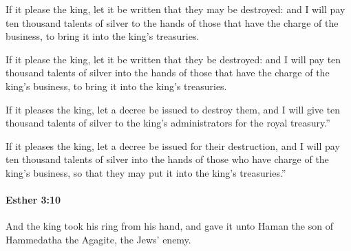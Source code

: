 			If it please the king, let it be written that they may be destroyed: and I will pay ten thousand talents of silver to the hands of those that have the charge of the business, to bring it into the king’s treasuries.

			\begin{versebox}
					\item[BHS] 
					\item[LXX] 
					\item[ASV] If it please the king, let it be written that they be destroyed: and I will pay ten thousand talents of silver into the hands of those that have the charge of the king's business, to bring it into the king's treasuries.
					\item[NIV] If it pleases the king, let a decree be issued to destroy them, and I will give ten thousand talents of silver to the king’s administrators for the royal treasury.”
					\item[NRSV] If it pleases the king, let a decree be issued for their destruction, and I will pay ten thousand talents of silver into the hands of those who have charge of the king’s business, so that they may put it into the king’s treasuries.”
			\end{versebox}

		\paragraph{Esther 3:10} %
			\label{ESTHER-3-10}

			And the king took his ring from his hand, and gave it unto Haman the son of Hammedatha the Agagite, the Jews’ enemy.

